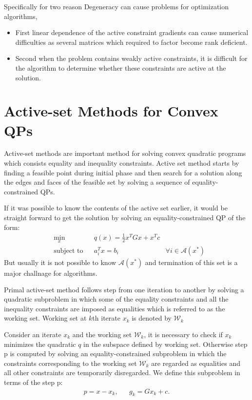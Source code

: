 Specifically for two reason Degeneracy can cause problems for optimization algorithms,
\begin{itemize}
	\item First linear dependence of the active constraint gradients can cause numerical difficulties as several matrices which required to factor become rank deficient.
	\item Second when the problem contains weakly active constraints, it is difficult for the algorithm to determine whether these constraints are active at the solution.
\end{itemize} 





\section{Active-set Methods for Convex QPs}
Active-set methods are important method for solving convex quadratic programs which consists equality and inequality constraints. Active set method starts by finding a feasible point during initial phase and then search for a solution along the edges and faces of the feasible set by solving a sequence of equality-constrained QPs.

If it was possible to know the contents of the active set earlier, it would be straight forward to get the solution by solving an equality-constrained QP of the form:
\begin{equation*}
	\begin{aligned}
		& \underset{x}{\text{min}} & & q(x)= \frac{1}{2}x^{T}Gx+x^{T}c \\
& \text{subject to} & &  a_{i}^{T}x = b_i & \forall i\in \mathcal{A}(x^*)
	\end{aligned}
\end{equation*}
But usually it is not possible to know $\mathcal{A}(x^*)$ and termination of this set is a major challnage for algorithms.

Primal active-set method follows step from one iteration to another by solving a quadratic subproblem in which some of the equality constraints and all the inequality constraints are imposed as equalities which is referred to as the working set. Working set at $k$th iterate $x_k$ is denoted by $\mathcal{W}_k$

Consider an iterate $x_k$ and the working set $\mathcal{W}_k$, it is necessary to check if $x_k$ minimizes the quadratic $q$ in the subspace defined by working set. Otherwise step p is computed by solving an equality-constrained subproblem in which the constraints corresponding to the working set $\mathcal{W}_k$ are regarded as equalities and all other constraints are temporarily disregarded. We define this subproblem in terms of the step p:
\begin{equation*}
	\begin{aligned}
		p = x - x_k, & & g_k = Gx_k + c.
	\end{aligned}
\end{equation*}


